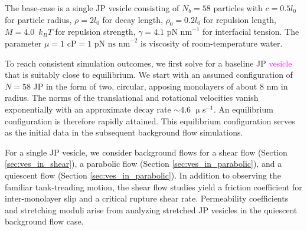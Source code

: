 \documentclass[lineno]{jfm}
\newcommand{\xx}{\mathbf{x}}
\newcommand{\uu}{\mathbf{u}}
\newcommand{\ReviewerThree}[1]{\textcolor{magenta}{#1}}
\begin{document}
The base-case is a single JP vesicle consisting of $N_b = 58$ particles
with $c = 0.5 l_0$ for particle radius, $\rho = 2 l_0$ for decay length, $\rho_0 = 0.2l_0$ for repulsion
length, $M=4.0$~$k_BT$ for repulsion strength, $\gamma = \text{4.1 pN
nm}^{-1}$ for interfacial tension.  The parameter $\mu = \text{1 cP} = \text{1 pN
ns nm}^{-2}$ is viscosity of room-temperature water. 

To reach consistent simulation outcomes, we first solve for a baseline
JP \ReviewerThree{vesicle} that is suitably close to equilibrium. We
start with an assumed configuration of $N=58$ JP in the form of two,
circular, apposing monolayers of about $8$ nm in radius. The norms of
the translational and rotational velocities vanish exponentially with an
approximate decay rate $\sim 4.6$ $\upmu$s$^{-1}$. An equilibrium
configuration is therefore rapidly attained. This equilibrium
configuration serves as the initial data in the subsequent background
flow simulations.

For a single JP vesicle, we consider background flows for a shear flow 
(Section \ref{sec:ves_in_shear}), 
a parabolic flow (Section \ref{sec:ves_in_parabolic}),
and a quiescent flow (Section \ref{sec:ves_in_parabolic}). 
In addition to observing the familiar tank-treading motion, the shear
flow studies yield a friction coefficient for inter-monolayer slip 
and a critical rupture shear rate.  Permeability coefficients and 
stretching moduli arise from analyzing stretched JP vesicles in the 
quiescent background flow case.  
 
%
%
\end{document}
